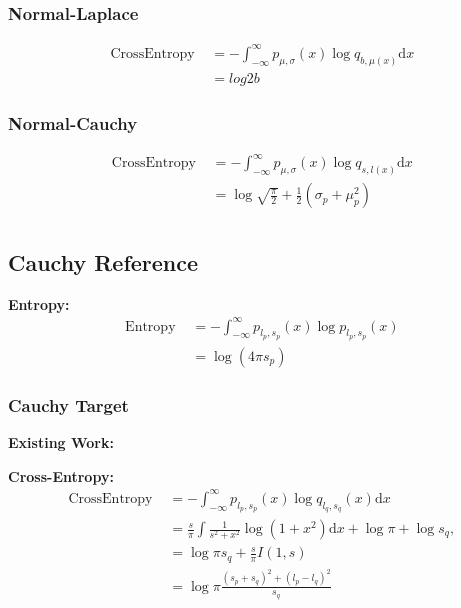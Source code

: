 \documentclass{article}
\begin{document}
\subsubsection{Normal-Laplace}

$$ \begin{aligned} \text { CrossEntropy }&=
-\int_{-\infty}^{\infty} p_{ \mu,\sigma}(x) \log q_{b,\mu(x)} \mathrm{d} x \\
&=log2b
\end{aligned}
$$

\subsubsection{Normal-Cauchy}
$$ \begin{aligned}  \text { CrossEntropy }&=-\int_{-\infty}^{\infty} p_{\mu,\sigma}(x) \log q_{s,l(x)} \mathrm{d} x \\
&=\log \sqrt{\frac{\pi}{2}}+ \frac{1}{2} (\sigma_{p}+\mu_{p}^2) \\
\end{aligned}
$$

\subsection{Cauchy Reference}

\noindent \textbf{Entropy:}
$$ \begin{aligned} \text { Entropy } &=-\int_{-\infty}^{\infty} p_{l_{p}, s_{p}}(x) \log p_{l_{p}, s_{p}}(x)\\
&=\log (4 \pi s_{p})\end{aligned} $$

\subsubsection{Cauchy Target}

\noindent \textbf{Existing Work:}

\noindent \textbf{Cross-Entropy:}
$$ \begin{aligned} \text { CrossEntropy }&=-\int_{-\infty}^{\infty} p_{l_{p}, s_{p}}(x) \log q_{l_{q}, s_{q}}(x) \mathrm{d} x\\& =\frac{s}{\pi} \int \frac{1}{s^{2}+x^{2}} \log \left(1+x^{2}\right) \mathrm{d} x+\log \pi+\log s_{q}, \\
&=\log \pi s_{q}+\frac{s}{\pi} I(1, s) \\
&=\log \pi \frac{\left(s_{p}+s_{q}\right)^{2}+\left(l_{p}-l_{q}\right)^{2}}{s_{q}}\\
\end{aligned} $$
\end{document}
